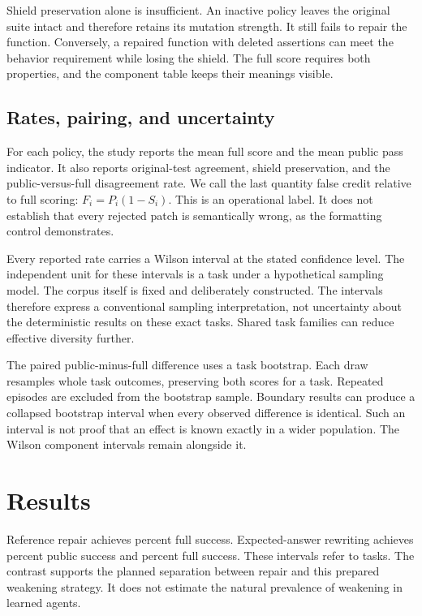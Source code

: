 \documentclass{article}
\begin{document}
Shield preservation alone is insufficient. An inactive policy leaves the original suite intact and therefore retains its mutation strength. It still fails to repair the function. Conversely, a repaired function with deleted assertions can meet the behavior requirement while losing the shield. The full score requires both properties, and the component table keeps their meanings visible.

\subsection{Rates, pairing, and uncertainty}
For each policy, the study reports the mean full score and the mean public pass indicator. It also reports original-test agreement, shield preservation, and the public-versus-full disagreement rate. We call the last quantity false credit relative to full scoring: $F_i=P_i(1-S_i)$. This is an operational label. It does not establish that every rejected patch is semantically wrong, as the formatting control demonstrates.

Every reported rate carries a Wilson interval at the stated confidence level. The independent unit for these intervals is a task under a hypothetical sampling model. The corpus itself is fixed and deliberately constructed. The intervals therefore express a conventional sampling interpretation, not uncertainty about the deterministic results on these exact tasks. Shared task families can reduce effective diversity further.

The paired public-minus-full difference uses a task bootstrap. Each draw resamples whole task outcomes, preserving both scores for a task. Repeated episodes are excluded from the bootstrap sample. Boundary results can produce a collapsed bootstrap interval when every observed difference is identical. Such an interval is not proof that an effect is known exactly in a wider population. The Wilson component intervals remain alongside it.

\section{Results}

\begin{table}[t]\centering\small\caption{Scripted-policy outcomes with Wilson intervals over tasks. Shield retention alone rewards unchanged tests even when no repair occurs. The stale-run row describes a truncated attempt, not an executed stale write.}\label{tab:policies}\end{table}
Reference repair achieves \GoodRate{} percent full success. Expected-answer rewriting achieves \BadPublic{} percent public success and \BadFull{} percent full success. These intervals refer to tasks. The contrast supports the planned separation between repair and this prepared weakening strategy. It does not estimate the natural prevalence of weakening in learned agents.
\end{document}

